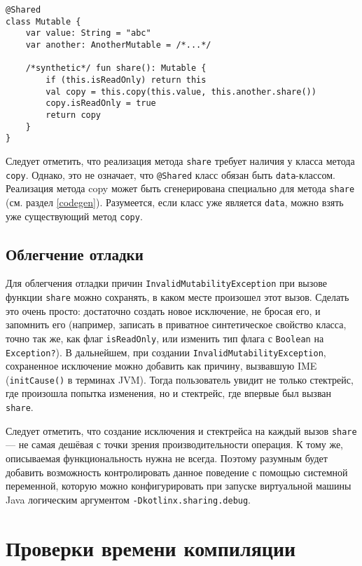 \documentclass[specification,annotation,times]{itmo-student-thesis}
\begin{document}
\begin{lstlisting}[float=h!,caption={Реализация share}]
@Shared
class Mutable {
	var value: String = "abc"
	var another: AnotherMutable = /*...*/
	
	/*synthetic*/ fun share(): Mutable {
		if (this.isReadOnly) return this
		val copy = this.copy(this.value, this.another.share())
		copy.isReadOnly = true
		return copy
	}
}
\end{lstlisting}

Следует отметить, что реализация метода \texttt{share} требует наличия у класса метода \texttt{copy}.
Однако, это не означает, что \texttt{@Shared} класс обязан быть \texttt{data}-классом.
Реализация метода copy может быть сгенерирована специально для метода \texttt{share} (см. раздел \ref{codegen}).
Разумеется, если класс уже является \texttt{data}, можно взять уже существующий метод \texttt{copy}.

\subsection{Облегчение отладки}

Для облегчения отладки причин \texttt{InvalidMutabilityException} при вызове функции \texttt{share} можно сохранять, в каком месте произошел этот вызов.
Сделать это очень просто: достаточно создать новое исключение, не бросая его, и запомнить его (например, записать в приватное синтетическое свойство класса, точно так же, как флаг \texttt{isReadOnly}, или изменить тип флага с \texttt{Boolean} на \texttt{Exception?}).
В дальнейшем, при создании \texttt{InvalidMutabilityException}, сохраненное исключение можно добавить как причину, вызвавшую IME (\texttt{initCause()} в терминах JVM).
Тогда пользователь увидит не только стектрейс, где произошла попытка изменения, но и стектрейс, где впервые был вызван \texttt{share}.

Следует отметить, что создание исключения и стектрейса на каждый вызов \texttt{share} --- не самая дешёвая с точки зрения производительности операция.
К тому же, описываемая функциональность нужна не всегда. Поэтому разумным будет добавить возможность контролировать данное поведение с помощью системной переменной, которую можно конфигурировать при запуске виртуальной машины Java логическим аргументом \texttt{-Dkotlinx.sharing.debug}.

\section{Проверки времени компиляции}\label{compile_checks}
\end{document}
